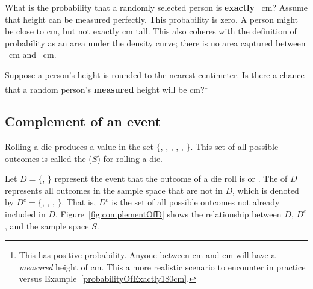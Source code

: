 \begin{example}{What is the probability that a randomly selected person is \textbf{exactly} ~cm? Assume that height can be measured perfectly.}
	\label{probabilityOfExactly180cm}
	This probability is zero. A person might be close to  cm, but not exactly  cm tall. This also coheres with the definition of probability as an area under the density curve; there is no area captured between ~cm and ~cm.
\end{example}

\begin{exercise}
	Suppose a person's height is rounded to the nearest centimeter. Is there a chance that a random person's \textbf{measured} height will be  cm?\footnote{This has positive probability. Anyone between  cm and  cm will have a \emph{measured} height of  cm. This a more realistic scenario to encounter in practice versus Example~\ref{probabilityOfExactly180cm}.}
\end{exercise}


\subsection{Complement of an event}

Rolling a die produces a value in the set $\{$, , , , , $\}$. This set of all possible outcomes is called the  ($S$) for rolling a die. 

Let $D=\{$, $\}$ represent the event that the outcome of a die roll is  or . The  of $D$ represents all outcomes in the sample space that are not in $D$, which is denoted by $D^c = \{$, , , $\}$. That is, $D^c$ is the set of all possible outcomes not already included in $D$. Figure~\ref{fig:complementOfD} shows the relationship between $D$, $D^c$, and the sample space $S$. 

